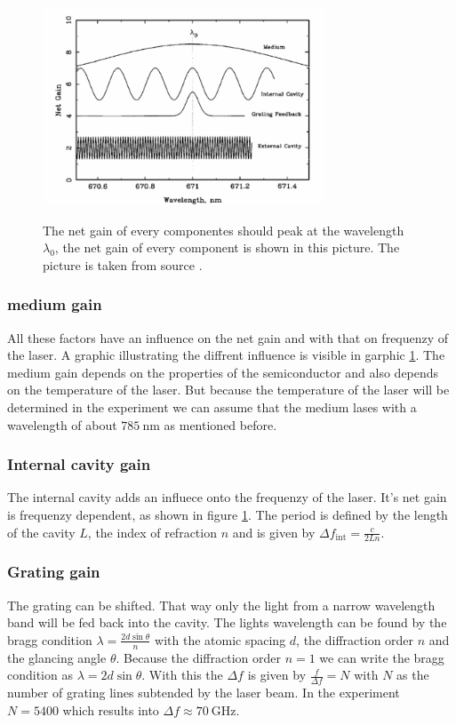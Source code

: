 \begin{figure}
    \centering
    \caption{The net gain of every componentes should peak at the wavelength $\lambda_0$, the net gain of every component is shown in this picture. The picture is taken from source \cite[6]{anleitung_laser}.}
    \includegraphics[width=0.75\textwidth]{content/data/netgain}
    \label{fig:netgain}
\end{figure}
\FloatBarrier
\subsubsection{medium gain}
All these factors have an influence on the net gain and with that on frequenzy of the laser.
A graphic illustrating the diffrent influence is visible in garphic \ref{fig:netgain}.
The medium gain depends on the properties of the semiconductor and also depends on the temperature of the laser.
But because the temperature of the laser will be determined in the experiment we can assume that the medium lases with a wavelength of about $\SI{785}{\nano\meter}$ as mentioned before.

\subsubsection{Internal cavity gain}
The internal cavity adds an influece onto the frequenzy of the laser.
It's net gain is frequenzy dependent, as shown in figure \ref{fig:netgain}.
The period is defined by the length of the cavity $L$, the index of refraction $n$ and is given by
$\Delta f_\text{int} = \frac{c}{2Ln}$.

\subsubsection{Grating gain}
The grating can be shifted.
That way only the light from a narrow wavelength band will be fed back into the cavity.
The lights wavelength can be found by the bragg condition $\lambda = \frac{2d \sin{\theta}}{n}$ with the atomic spacing $d$, the diffraction order $n$ and the glancing angle $\theta$.
Because the diffraction order $n = 1$ we can write the bragg condition as $\lambda = 2d\sin{\theta}$.
With this the $\Delta f$ is given by $\frac{f}{\Delta f} = N$ with $N$ as the number of grating lines subtended by the laser beam.
In the experiment $N=5400$ which results into $\Delta f \approx \SI{70}{\giga\Hz}$.

